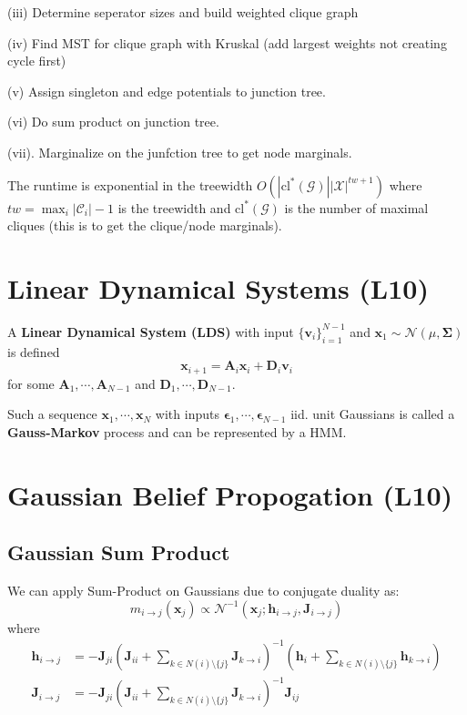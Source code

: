 \documentclass[9pt]{article}
\begin{document}
\begin{multicols}{2}
(iii) Determine seperator sizes and build weighted clique graph

(iv) Find MST for clique graph with Kruskal (add largest weights
not creating cycle first)

(v) Assign singleton and edge potentials to junction tree. 

(vi) Do sum product on junction tree. 

(vii). Marginalize on the junfction tree to get node marginals. 

The runtime is exponential in the treewidth
$O(|\text{cl}^*(\mathcal{G})||\mathcal{X}|^{tw+1})$ where $tw= \max_{i}|\mathcal{C}_i|-1$ is the treewidth and $\text{cl}^*(\mathcal{G})$ is the number of maximal cliques (this is to
get the clique/node marginals). 

\section{Linear Dynamical Systems (L10)}

A \textbf{Linear Dynamical System (LDS)} with input $\{\mathbf{v}_i\}_{i=1}^{N-1}$ and $\mathbf{x}_1 \sim \mathcal{N}(\mu,\mathbf{\Sigma})$ is defined 
$$\mathbf{x}_{i+1}=\mathbf{A}_i\mathbf{x}_i+\mathbf{D}_i\mathbf{v}_i$$
for some $\mathbf{A}_1,\cdots,\mathbf{A}_{N-1}$ and
$\mathbf{D}_1, \cdots, \mathbf{D}_{N-1}$. 

Such a sequence $\mathbf{x}_1,\cdots,\mathbf{x}_N$ with inputs 
$\boldsymbol{\epsilon}_1,\cdots,\boldsymbol{\epsilon}_{N-1}$ iid. unit Gaussians is called a \textbf{Gauss-Markov} process and can be represented by a HMM.

\section{Gaussian Belief Propogation (L10)}

\subsection{Gaussian Sum Product}
We can apply Sum-Product on Gaussians due to conjugate duality as:
\[
    m_{i \to j}(\mathbf{x}_j) \propto \mathcal{N}^{-1}(\mathbf{x}_j; \mathbf{h}_{i \to j}, \mathbf{J}_{i \to j})
\]
where
\begin{align*}
    \mathbf{h}_{i \to j} &= -\mathbf{J}_{ji} \left( \mathbf{J}_{ii} + \sum_{k \in N(i) \setminus \{j\}} \mathbf{J}_{k \to i} \right)^{-1} \left( \mathbf{h}_i + \sum_{k \in N(i) \setminus \{j\}} \mathbf{h}_{k \to i} \right)  \\
    \mathbf{J}_{i \to j} &= -\mathbf{J}_{ji} \left( \mathbf{J}_{ii} + \sum_{k \in N(i) \setminus \{j\}} \mathbf{J}_{k \to i} \right)^{-1} \mathbf{J}_{ij}
\end{align*}


\end{multicols}
\end{document}
